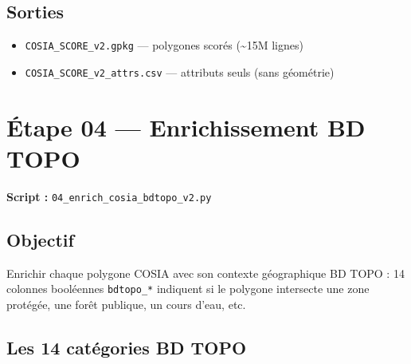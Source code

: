 \documentclass[11pt,a4paper]{report}
\newcommand{\code}[1]{\texttt{\small #1}}
\newcommand{\bdtopo}{\textsc{BD TOPO}}
\begin{document}
\subsection{Sorties}

\begin{itemize}
  \item \code{COSIA\_SCORE\_v2.gpkg} — polygones scorés (\textasciitilde{}15M lignes)
  \item \code{COSIA\_SCORE\_v2\_attrs.csv} — attributs seuls (sans géométrie)
\end{itemize}

\section{Étape 04 — Enrichissement BD TOPO}

\textbf{Script :} \code{04\_enrich\_cosia\_bdtopo\_v2.py}

\subsection{Objectif}

Enrichir chaque polygone COSIA avec son contexte géographique \bdtopo{} : 14 colonnes booléennes \code{bdtopo\_*} indiquent si le polygone intersecte une zone protégée, une forêt publique, un cours d'eau, etc.

\subsection{Les 14 catégories BD TOPO}
\end{document}
